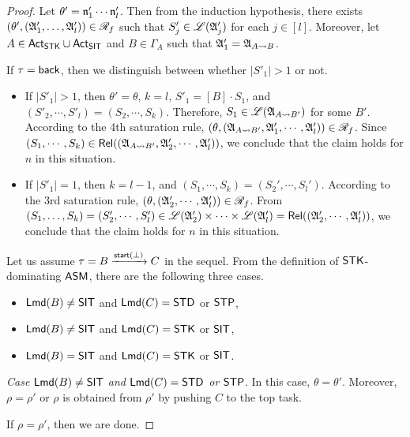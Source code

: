 \begin{proof}
Let $\theta'= \mathfrak{n}'_1 \cdots \mathfrak{n}'_l$. Then from the induction hypothesis, there exists $(\theta', ({\mathfrak{A} }'_1, \dots, {\mathfrak{A} }'_l)) \in \mathscr{R}_f$ such that $S'_j \in {\mathscr{L} }({\mathfrak{A} }'_j)$ for each $j \in [l]$. Moreover, let $A \in {\sf Act}_{\sf STK}\cup{\sf Act}_{\sf SIT}$ and $B \in \Gamma_A$ such that ${\mathfrak{A} }'_1 = {\mathfrak{A} }_{A \rightsquigarrow B}$. 

If $\tau = {\mathsf{back} }$, then we distinguish between whether $|S'_1| > 1$ or not. 
\begin{itemize}
\item If $|S'_1| > 1$, then $\theta' = \theta$, $k=l$, $S'_1 = [B] \cdot S_1$, and $(S'_2, \cdots, S'_l) = (S_2, \cdots, S_k)$. 
Therefore, $S_1 \in {\mathscr{L} }({\mathfrak{A} }_{A \rightsquigarrow B'})$ for some $B'$. According to the 4th saturation rule, $(\theta, ({\mathfrak{A} }_{A \rightsquigarrow B'}, {\mathfrak{A} }'_1, \cdots, {\mathfrak{A} }'_l)) \in \mathscr{R}_f$. Since $(S_1, \cdots, S_k) \in \mathsf{Rel}(({\mathfrak{A} }_{A \rightsquigarrow B'}, {\mathfrak{A} }'_2, \cdots, {\mathfrak{A} }'_l))$, we conclude that the claim holds for $n$ in this situation. 
%
\item If $|S'_1| = 1$, then $k = l - 1$, and $(S_1,\cdots,S_k) = (S_2',\cdots,S_l')$. According to the 3rd saturation rule, $(\theta, ({\mathfrak{A} }_2',\cdots,{\mathfrak{A} }_l')) \in \mathscr{R}_f$. From $(S_1,\dots,S_k) = (S'_2, \cdots, S'_l) \in {\mathscr{L} }({\mathfrak{A} }_2') \times \cdots \times {\mathscr{L} }({\mathfrak{A} }_l') = \mathsf{Rel}(({\mathfrak{A} }'_2, \cdots, {\mathfrak{A} }'_l))$, we conclude that the claim holds for $n$ in this situation. 
\end{itemize}


Let us assume $\tau = B \xrightarrow{{\mathsf{start} }(\bot)} C$ in the sequel. From the definition of ${\sf STK}$-dominating $\textsf{ASM}$, there are the following three cases. 
\begin{itemize}
\item ${\sf Lmd}(B) \neq {\sf SIT}$ and ${\sf Lmd}(C) = {\sf STD}$ or ${\sf STP}$, 
%
\item ${\sf Lmd}(B) \neq {\sf SIT}$ and ${\sf Lmd}(C) = {\sf STK}$ or ${\sf SIT}$, 
%
\item ${\sf Lmd}(B) = {\sf SIT}$ and ${\sf Lmd}(C) = {\sf STK}$ or ${\sf SIT}$. 
\end{itemize}

\smallskip

\noindent \emph{Case ${\sf Lmd}(B) \neq {\sf SIT}$ and ${\sf Lmd}(C) = {\sf STD}$ or ${\sf STP}$}. In this case, $\theta = \theta'$. Moreover, $\rho = \rho'$ or $\rho$ is obtained from $\rho'$ by pushing $C$ to the top task.

If $\rho = \rho'$, then we are done. 


\end{proof}

